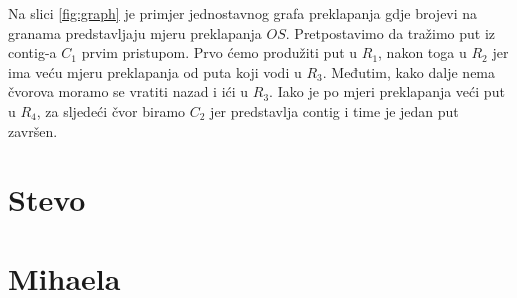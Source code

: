 Na slici \ref{fig:graph} je primjer jednostavnog grafa preklapanja gdje brojevi na granama predstavljaju mjeru preklapanja $OS$. Pretpostavimo da tražimo put iz contig-a $C_1$ prvim pristupom. Prvo ćemo produžiti put u $R_1$, nakon toga u $R_2$ jer ima veću mjeru preklapanja od puta koji vodi u $R_3$. Međutim, kako dalje nema čvorova moramo se vratiti nazad i ići u $R_3$. Iako je po mjeri preklapanja veći put u $R_4$, za sljedeći čvor biramo $C_2$ jer predstavlja contig i time je jedan put završen.

\section{Stevo}

\section{Mihaela}